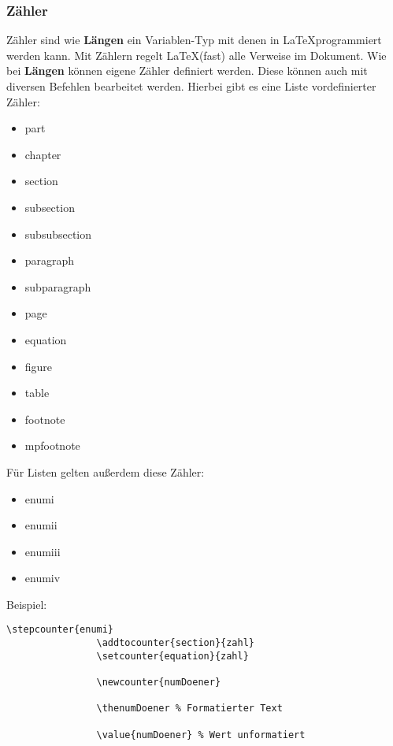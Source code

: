 \documentclass[10pt]{scrartcl}  %
\begin{document}
        \subsubsection{Zähler}
            Zähler sind wie \textbf{Längen} ein Variablen-Typ mit denen in \LaTeX \@ programmiert werden kann. Mit Zählern regelt \LaTeX \@ (fast) alle Verweise im Dokument. Wie bei \textbf{Längen} können eigene Zähler definiert werden.
            Diese können auch mit diversen Befehlen bearbeitet werden. Hierbei gibt es eine Liste vordefinierter Zähler:
            \begin{itemize}
                \item part
                \item chapter
                \item section
                \item subsection
                \item subsubsection
                \item paragraph
                \item subparagraph
                \item page
                \item equation
                \item figure
                \item table
                \item footnote
                \item mpfootnote
            \end{itemize}
            Für Listen gelten außerdem diese Zähler:
            \begin{itemize}
                \item enumi
                \item enumii
                \item enumiii
                \item enumiv
            \end{itemize}
            Beispiel:
            \lstset{language=TeX}
            \begin{lstlisting}[frame=single]
                \stepcounter{enumi}
                \addtocounter{section}{zahl}
                \setcounter{equation}{zahl}

                \newcounter{numDoener}

                \thenumDoener % Formatierter Text

                \value{numDoener} % Wert unformatiert
            \end{lstlisting}
\end{document}

